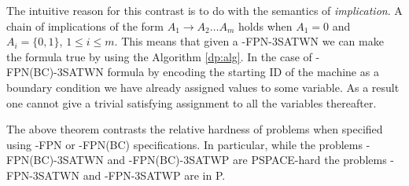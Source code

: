  








The intuitive reason for this contrast is to do with the semantics of 
{\em implication}. 
A chain of implications of the form $A_1 \rightarrow A_2 \ldots A_m$ 
holds when $A_1 = 0$ and $ A_i = \{0,1\}$, $ 1 \leq i \leq m$.  
This means that given a {-FPN-3SATWN} 
we can make the formula true by using the Algorithm \ref{dp:alg}.
In the case of {-FPN(BC)-3SATWN} formula by encoding the starting ID 
of the 
machine as a boundary condition we have already assigned values to some 
variable. As a result one cannot give a trivial satisfying assignment to
all the variables thereafter.


The above theorem contrasts the relative hardness of problems when specified
using {-FPN} or 
{-FPN(BC)} specifications. In particular, while the
problems {-FPN(BC)-3SATWN} and 
{-FPN(BC)-3SATWP} are {\sf PSPACE}-hard the problems
{-FPN-3SATWN} and {-FPN-3SATWP} are in {\sf P}.
